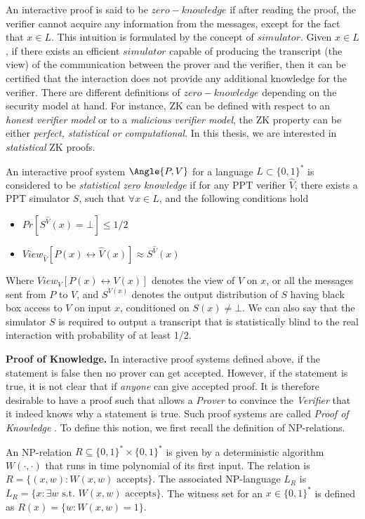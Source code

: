 An interactive proof is said to be \(zero-knowledge \) if after reading the
proof, the verifier cannot acquire any information from the messages, except for the
fact that \(x \in L\). This intuition is formulated by the concept of
\(simulator\). Given \(x \in L\), if there exists an efficient \(simulator\) capable of producing the transcript (the view) of the communication between the prover
and the verifier, then it can be certified that the interaction does not provide any additional
knowledge for the verifier. There are different definitions of \(zero-knowledge\)
depending on the security model at hand. For instance, ZK can be defined with
respect to an \textit{honest verifier model} or to a \textit{malicious verifier model},
the ZK property can be either \textit{perfect, statistical or computational}. In
this thesis, we are interested in \textit{statistical } ZK proofs.

\begin{definition}
   An interactive proof system \(\Angle{P,V}\) for a language
  \(L \subset \{0,1\}^{*}\) is considered to be \textit{statistical zero knowledge } if
  for any PPT verifier \(\hat{V}\), there exists a PPT simulator \(S\), such
  that \(\forall x \in L\), and the following conditions hold
  \begin{itemize}
  \item \(Pr[S^{\hat{V}}(x) = \bot] \leq 1/2\)
  \item \(View_{\hat{V}}[P(x) \leftrightarrow \hat{V}(x)] \approx S^{\hat{V}}(x)\)
  \end{itemize}
\end{definition}
Where \(View_{V}[P(x) \leftrightarrow V(x)]\) denotes the view of \(V\) on
\(x\), or all the messages sent from \(P\) to \(V\), and \(S^{V(x)}\) denotes
the output distribution of \(S\) having black box access to \(V\) on input
\(x\), conditioned on \(S(x) \neq \bot\).  We can also say that the simulator
\(S\) is required to output a transcript that is statistically blind to the real
interaction with probability of at least 1/2.

\textbf{Proof of Knowledge.} In interactive proof systems defined above, if the
statement is false then no prover can get accepted. However, if the statement is
true, it is not clear that if \textit{anyone} can give accepted proof. It is
therefore desirable to have a proof such that allows a \textit{Prover} to
convince the \textit{Verifier} that it indeed knows why a statement is
true. Such proof systems are called \textit{Proof of Knowledge}
\cite{goldwasser1989knowledge, bellare1992defining}. To define this notion, we
first recall the definition of NP-relations.
\begin{definition}[NP-relation]
  An NP-relation $R \subseteq \{0,1\}^{*} \times \{0,1\}^{*} $ is given by a
  deterministic algorithm $W(\cdot, \cdot)$ that runs in time polynomial of its
  first input. The relation is $R= \{(x,w): W(x, w) \text{ accepts}\}$. The
  associated NP-language $L_{R}$ is
  $L_{R} = \{x: \exists w \text{ s.t. } W(x,w) \text{ accepts}\}$. The witness set
  for an $x \in \{0,1\}^{*}$ is defined as $R(x) = \{w: W(x,w) = 1\}$.
\end{definition}

